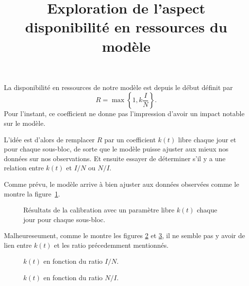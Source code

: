 \documentclass[a4paper, 11pt]{article}
\title{Exploration de l'aspect disponibilité en ressources du modèle}
\author{}
\date{}
\begin{document}
 \maketitle
 
 La disponibilité en ressources de notre modèle est depuis le début définit par
 \[
  R = \max\left\{1, k\frac{I}{N}\right\}.
 \]
 Pour l'instant, ce coefficient ne donne pas l'impression d'avoir un impact notable sur le modèle.
 
 L'idée est d'alors de remplacer $R$ par un coefficient $k(t)$ libre chaque jour et pour chaque sous-bloc, de sorte que le modèle puisse ajuster aux mieux nos données sur nos observations. Et ensuite essayer de déterminer s'il y a une relation entre $k(t)$ et $I/N$ ou $N/I$.

 Comme prévu, le modèle arrive à bien ajuster aux données observées comme le montre la figure~\ref{toto}.
 \begin{figure}[ht]
  \centering
  \caption{Résultats de la calibration avec un paramètre libre $k(t)$ chaque jour pour chaque sous-bloc.}
  \label{toto}
 \end{figure}

 Malheureseument, comme le montre les figures \ref{tutu} et \ref{titi}, il ne semble pas y avoir de lien entre $k(t)$ et les ratio précedemment mentionnés.
 
 
  \begin{figure}[ht]
  \centering
  \caption{$k(t)$ en fonction du ratio $I/N$.}
  \label{tutu}
 \end{figure}

  \begin{figure}[ht]
  \centering
  \caption{$k(t)$ en fonction du ratio $N/I$.}
  \label{titi}
 \end{figure}

 
 
\end{document}
